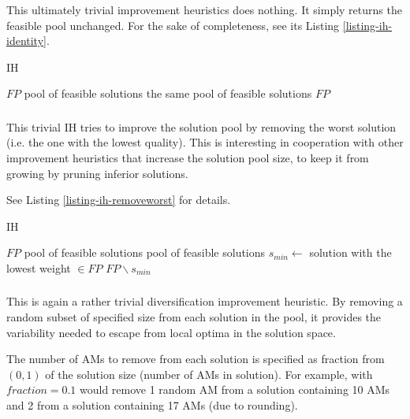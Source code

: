 \subsubsection{}

This ultimately trivial improvement heuristics does nothing. It simply returns the feasible pool unchanged. For the sake of completeness, see its Listing \ref{listing-ih-identity}.

\begin{algorithm}
\caption{ IH}
\label{listing-ih-identity}
\begin{algorithmic}
\REQUIRE $FP$ pool of feasible solutions
\ENSURE the same pool of feasible solutions
\RETURN $FP$
\end{algorithmic}
\end{algorithm}

\subsubsection{}

This trivial IH tries to improve the solution pool by removing the worst solution (i.e. the one with the lowest quality). This is interesting in cooperation with other improvement heuristics that increase the solution pool size, to keep it from growing by pruning inferior solutions.

See Listing \ref{listing-ih-removeworst} for details.

\begin{algorithm}
\caption{ IH}
\label{listing-ih-removeworst}
\begin{algorithmic}
\REQUIRE $FP$ pool of feasible solutions
\ENSURE pool of feasible solutions
\STATE $s_{min} \gets $ solution with the lowest weight $\in FP$
\RETURN $FP \backslash s_{min}$
\end{algorithmic}
\end{algorithm}

\subsubsection{}

This is again a rather trivial diversification improvement heuristic. By removing a random subset of specified size from each solution in the pool, it provides the variability needed to escape from local optima in the solution space.

The number of AMs to remove from each solution is specified as fraction from $(0, 1)$ of the solution size (number of AMs in solution). For example,  with $fraction = 0.1$ would remove 1 random AM from a solution containing 10 AMs and 2 from a solution containing 17 AMs (due to rounding).


